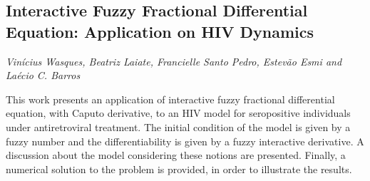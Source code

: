 \documentclass[../booklet.tex]{subfiles}
\begin{document}
\subsection[Interactive Fuzzy Fractional Differential Equation: Application on HIV Dynamics. {\it Vinícius Wasques, Beatriz Laiate, Francielle Santo Pedro, Estevão Esmi and Laécio C. Barros}]{Interactive Fuzzy Fractional Differential Equation: Application on HIV Dynamics}
    

\begin{center}
  {\it Vinícius Wasques, Beatriz Laiate, Francielle Santo Pedro, Estevão Esmi and Laécio C. Barros}
\end{center}




This work presents an application of interactive fuzzy fractional differential equation, with Caputo derivative, to an HIV model for seropositive individuals under antiretroviral treatment. The initial condition of the model is given by a fuzzy number and the differentiability is given by a fuzzy interactive derivative. A discussion about the model considering these notions are presented. Finally, a numerical solution to the problem is provided, in order to illustrate the results.

\end{document}
